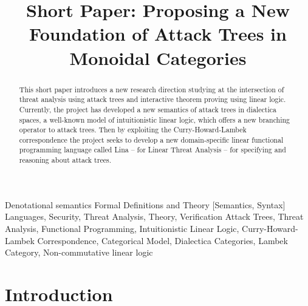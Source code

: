 \documentclass{sigplanconf}
\date{}
\begin{document}
\copyrightdata{}
\copyrightdoi{}
\titlebanner{}

\title{Short Paper: Proposing a New Foundation of Attack Trees in Monoidal Categories}


\maketitle 

\begin{abstract}
  This short paper introduces a new research direction studying at the
  intersection of threat analysis using attack trees and interactive
  theorem proving using linear logic.  Currently, the project has
  developed a new semantics of attack trees in dialectica spaces, a
  well-known model of intuitionistic linear logic, which offers a new
  branching operator to attack trees.  Then by exploiting the
  Curry-Howard-Lambek correspondence the project seeks to develop a
  new domain-specific linear functional programming language called
  Lina -- for Linear Threat Analysis -- for specifying and reasoning
  about attack trees.
\end{abstract}

         {Denotational semantics}
         {Formal Definitions and Theory}
         [Semantics, Syntax]
\terms
Languages, Security, Threat Analysis, Theory, Verification
\keywords
Attack Trees, Threat Analysis, Functional Programming, Intuitionistic
Linear Logic, Curry-Howard-Lambek Correspondence, Categorical Model,
Dialectica Categories, Lambek Category, Non-commutative linear logic

\section{Introduction}
\label{sec:introduction}
\end{document}
